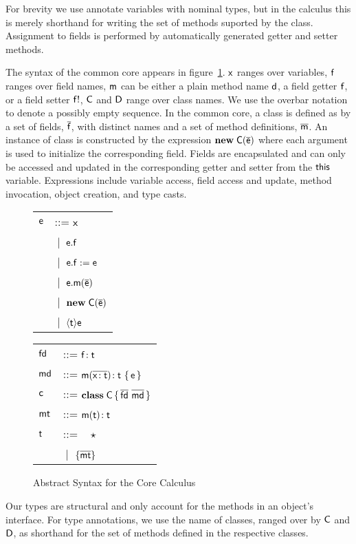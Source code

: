 \documentclass[preprint]{sigplanconf}
\newcommand{\fd}{\M{\xt{fd}}}
\newcommand{\md}{\M{\xt{md}}}
\newcommand{\mt}{\M{\xt{mt}}}
\newcommand{\m}{\M{\xt{m}}}
\newcommand{\e}{\M{\xt{e}}}
\renewcommand{\d}{\M{\xt{d}}}
\newcommand{\f}{\M{\xt{f}}}
\newcommand{\fb}{\M{\xt{f!}}}
\newcommand{\x}{\M{\xt{x}}}
\renewcommand{\t}{\M{\xt{t}}}
\renewcommand{\c}{\M{\xt{c}}}
\newcommand{\C}{\M{\xt{C}}}
\newcommand{\D}{\M{\xt{D}}}
\newcommand{\this}{\M{\xt{this}}}
\renewcommand{\d}{\M{\xt{d}}}
\newcommand{\new}{\M{\bt{new}}}
\newcommand{\Get}[2]{\M{#1.#2}}
\newcommand{\Set}[3]{\M{#1.#2:=#3}}
\newcommand{\Call}[3]{\M{#1.#2(#3)}}
\newcommand{\New}[2]{\M{\new\;#1({#2})}}
\newcommand{\Cast}[2]{\M{\langle{#1}\rangle{#2}}}
\newcommand{\any}{\M{\star}}
\newcommand{\Type}[1]{\M{\{ #1 \}}}
\newcommand{\HT}[2]{\M{{#1}\!:{#2}}}
\newcommand{\Mdef}[5]{\M{ \HT { #1( \b{\HT{#2}{#3}})}{#4}~ \{\, {#5} \,\} }}
\newcommand{\Ftype}[2]{\M{ \HT{#1}{#2} }}
\newcommand{\Mtype}[3]{\M{ \HT { #1( #2 )}{#3}}}
\newcommand{\Class}[3]{\M{\bt{class}\;#1\,\{\, #2 ~ #3\, \}}}
\newcommand{\Alt}[1]{ &\B #1 \\}
\newcommand{\B}{\M{~|~}}
\newcommand{\M}[1]{\ensuremath{#1}\xspace}
\newcommand{\xt}[1]{{\sf{#1}}\xspace}
\newcommand{\bt}[1]{\xt{\bf #1}}
\renewcommand{\b}[1]{\M{\overline{#1}}}
\begin{document}
For brevity we use annotate variables with nominal types, but in the
calculus this is merely shorthand for writing the set of methods suported 
by the class. Assignment to fields is performed by automatically generated
getter and setter methods.

The syntax of the common core appears in figure~\ref{syn}.  \x ranges
over variables, \f ranges over field names, \m can be either a plain method
name \d, a field getter \f, or a field setter \fb, \C and \D range over
class names. We use the overbar notation to denote a possibly empty
sequence. In the common core, a class is defined as by a set of fields,
\b\f, with distinct names and a set of method definitions, \b\m. An instance
of class is constructed by the expression \New\C{\b\e} where each argument
is used to initialize the corresponding field. Fields are encapsulated and
can only be accessed and updated in the corresponding getter and setter from
the \this variable.  Expressions include variable access, field access and
update, method invocation, object creation, and type casts.



\begin{figure}[!h]\begin{minipage}{3cm}\begin{tabular}{l@{~~~}l}
\e &::=  \x \\
   \Alt{ \Get\e\f }
   \Alt{ \Set\e\f\e }
   \Alt{ \Call\e\m{\b\e} }
   \Alt{ \New\C{\b\e} }
   \Alt{ \Cast\t\e }
\end{tabular}\end{minipage}\begin{minipage}{3cm}\begin{tabular}{l@{~~~}l}
\fd &::= 
    \Ftype\f\t   \\
\md &::=
    \Mdef\m\x\t\t\e \\
\c &::= \Class \C {\b{\fd}}{\b{\md} } \\
\mt &::= \Mtype\m\t\t\\
\t &::= ~ \any \\
   \Alt{ \Type{  \b{ \mt } } }
\end{tabular}\end{minipage}
\caption{Abstract Syntax for the Core Calculus}\label{syn}
\end{figure}

Our types are structural and only account for the methods in an object's
interface. For type annotations, we use the name of classes, ranged over by
\C and \D, as shorthand for the set of methods defined in the respective
classes.
\end{document}
